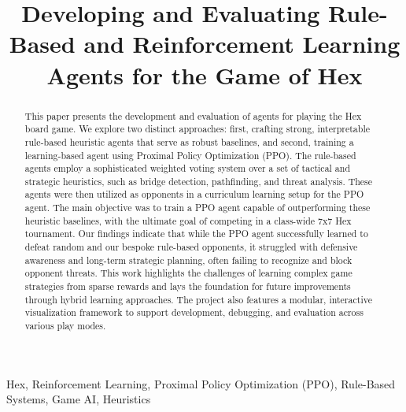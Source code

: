\documentclass[conference]{IEEEtran}
\begin{document}
\title{Developing and Evaluating Rule-Based and Reinforcement Learning Agents for the Game of Hex}

\author{
\and
{}
}

\maketitle

\begin{abstract}
This paper presents the development and evaluation of agents for playing the Hex board game. We explore two distinct approaches: first, crafting strong, interpretable rule-based heuristic agents that serve as robust baselines, and second, training a learning-based agent using Proximal Policy Optimization (PPO). The rule-based agents employ a sophisticated weighted voting system over a set of tactical and strategic heuristics, such as bridge detection, pathfinding, and threat analysis. These agents were then utilized as opponents in a curriculum learning setup for the PPO agent. The main objective was to train a PPO agent capable of outperforming these heuristic baselines, with the ultimate goal of competing in a class-wide 7x7 Hex tournament. Our findings indicate that while the PPO agent successfully learned to defeat random and our bespoke rule-based opponents, it struggled with defensive awareness and long-term strategic planning, often failing to recognize and block opponent threats. This work highlights the challenges of learning complex game strategies from sparse rewards and lays the foundation for future improvements through hybrid learning approaches. The project also features a modular, interactive visualization framework to support development, debugging, and evaluation across various play modes.
\end{abstract}

\begin{IEEEkeywords}
Hex, Reinforcement Learning, Proximal Policy Optimization (PPO), Rule-Based Systems, Game AI, Heuristics
\end{IEEEkeywords}
\end{document}
